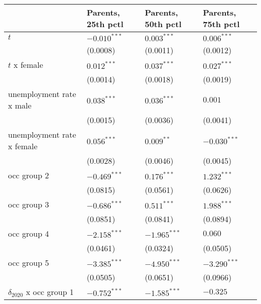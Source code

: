 \begin{tabular}{llll}
\toprule
{} & Parents, 25th pctl & Parents, 50th pctl & Parents, 75th pctl \\
\midrule
$t$                                    &     $-0.010^{***}$ &      $0.003^{***}$ &      $0.006^{***}$ \\
                                       &           (0.0008) &           (0.0011) &           (0.0012) \\
$t$ x female                           &      $0.012^{***}$ &      $0.037^{***}$ &      $0.027^{***}$ \\
                                       &           (0.0014) &           (0.0018) &           (0.0019) \\
unemployment rate x male               &      $0.038^{***}$ &      $0.036^{***}$ &            $0.001$ \\
                                       &           (0.0015) &           (0.0036) &           (0.0041) \\
unemployment rate x female             &      $0.056^{***}$ &       $0.009^{**}$ &     $-0.030^{***}$ \\
                                       &           (0.0028) &           (0.0046) &           (0.0045) \\
occ group 2                            &     $-0.469^{***}$ &      $0.176^{***}$ &      $1.232^{***}$ \\
                                       &           (0.0815) &           (0.0561) &           (0.0626) \\
occ group 3                            &     $-0.686^{***}$ &      $0.511^{***}$ &      $1.988^{***}$ \\
                                       &           (0.0851) &           (0.0841) &           (0.0894) \\
occ group 4                            &     $-2.158^{***}$ &     $-1.965^{***}$ &            $0.060$ \\
                                       &           (0.0461) &           (0.0324) &           (0.0505) \\
occ group 5                            &     $-3.385^{***}$ &     $-4.950^{***}$ &     $-3.290^{***}$ \\
                                       &           (0.0505) &           (0.0651) &           (0.0966) \\
$\delta_{2020}$ x occ group 1          &     $-0.752^{***}$ &     $-1.585^{***}$ &           $-0.325$ \\

\end{tabular}
